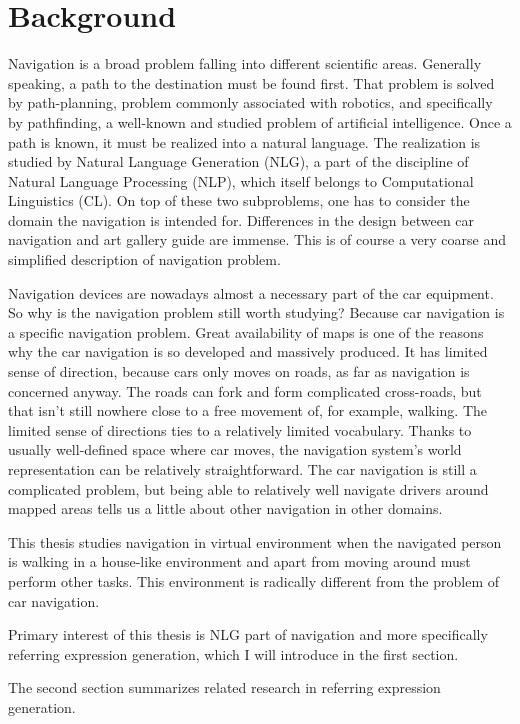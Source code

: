 \chapter{Background}
\label{chap:bg}
Navigation is a broad problem falling into different scientific areas. Generally speaking, a path to the destination must be found first. That problem is solved by path-planning, problem commonly associated with robotics, and specifically by pathfinding, a well-known and studied problem of artificial intelligence. Once a path is known, it must be realized into a natural language. The realization is studied by Natural Language Generation (NLG), a part of the discipline of Natural Language Processing (NLP), which itself belongs to Computational Linguistics (CL). On top of these two subproblems, one has to consider the domain the navigation is intended for. Differences in the design between car navigation and art gallery guide are immense. This is of course a very coarse and simplified description of navigation problem.

Navigation devices are nowadays almost a necessary part of the car equipment. So why is the navigation problem still worth studying? Because car navigation is a specific navigation problem. Great availability of maps is one of the reasons why the car navigation is so developed and massively produced. It has limited sense of direction, because cars only moves on roads, as far as navigation is concerned anyway. The roads can fork and form complicated cross-roads, but that isn't still nowhere close to a free movement of, for example, walking. The limited sense of directions ties to a relatively limited vocabulary. Thanks to usually well-defined space where car moves, the navigation system's world representation can be relatively straightforward. The car navigation is still a complicated problem, but being able to relatively well navigate drivers around mapped areas tells us a little about other navigation in other domains.

This thesis studies navigation in virtual environment when the navigated person is walking in a house-like environment and apart from moving around must perform other tasks. This environment is radically different from the problem of car navigation. 

Primary interest of this thesis is NLG part of navigation and more specifically referring expression generation, which I will introduce in the first section. 

The second section summarizes related research in referring expression generation. 



